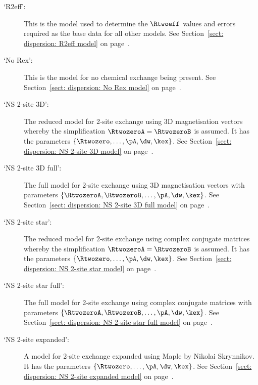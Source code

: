 \begin{description}
\item[`R2eff':]  This is the model used to determine the $\Rtwoeff$ values and errors required as the base data for all other models.  See Section~\ref{sect: dispersion: R2eff model} on page~\pageref{sect: dispersion: R2eff model}.
\item[`No Rex':]  This is the model for no chemical exchange being present.  See Section~\ref{sect: dispersion: No Rex model} on page~\pageref{sect: dispersion: No Rex model}.
\item[`NS 2-site 3D':]  The reduced model for 2-site exchange using 3D magnetisation vectors whereby the simplification $\RtwozeroA = \RtwozeroB$ is assumed.  It has the parameters $\{\Rtwozero, \dots, \pA, \dw, \kex\}$.  See Section~\ref{sect: dispersion: NS 2-site 3D model} on page~\pageref{sect: dispersion: NS 2-site 3D model}.
\item[`NS 2-site 3D full':]  The full model for 2-site exchange using 3D magnetisation vectors with parameters $\{\RtwozeroA, \RtwozeroB, \dots, \pA, \dw, \kex\}$.  See Section~\ref{sect: dispersion: NS 2-site 3D full model} on page~\pageref{sect: dispersion: NS 2-site 3D full model}.
\item[`NS 2-site star':]  The reduced model for 2-site exchange using complex conjugate matrices whereby the simplification $\RtwozeroA = \RtwozeroB$ is assumed.  It has the parameters $\{\Rtwozero, \dots, \pA, \dw, \kex\}$.  See Section~\ref{sect: dispersion: NS 2-site star model} on page~\pageref{sect: dispersion: NS 2-site star model}.
\item[`NS 2-site star full':]  The full model for 2-site exchange using complex conjugate matrices with parameters $\{\RtwozeroA, \RtwozeroB, \dots, \pA, \dw, \kex\}$.  See Section~\ref{sect: dispersion: NS 2-site star full model} on page~\pageref{sect: dispersion: NS 2-site star full model}.
\item[`NS 2-site expanded':]  A model for 2-site exchange expanded using Maple by Nikolai Skrynnikov.  It has the parameters $\{\Rtwozero, \dots, \pA, \dw, \kex\}$.  See Section~\ref{sect: dispersion: NS 2-site expanded model} on page~\pageref{sect: dispersion: NS 2-site expanded model}.
\end{description}


